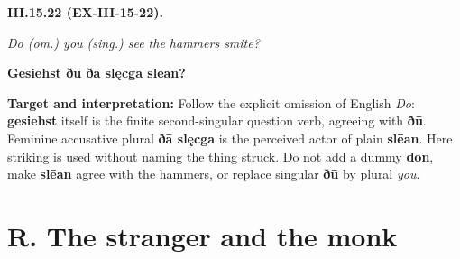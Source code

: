 \par\begin{minipage}{\linewidth}\raggedright
\textbf{III.15.22 (EX-III-15-22).}

\emph{Do (om.) you (sing.) see the hammers smite?}

\textbf{Gesiehst ðū ðā slęcga slēan?}

\textbf{Target and interpretation:} Follow the explicit omission of English \emph{Do}: \textbf{gesiehst} itself is the finite second-singular question verb, agreeing with \textbf{ðū}. Feminine accusative plural \textbf{ðā slęcga} is the perceived actor of plain \textbf{slēan}. Here striking is used without naming the thing struck. Do not add a dummy \textbf{dōn}, make \textbf{slēan} agree with the hammers, or replace singular \textbf{ðū} by plural \emph{you}.

\end{minipage}\par\addvspace{4pt}

\clearpage
\section*{R. The stranger and the monk}

